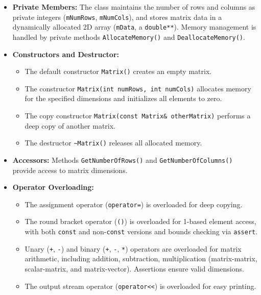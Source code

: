 \begin{itemize}
    \item \textbf{Private Members:} The class maintains the number of rows and columns as private integers (\texttt{mNumRows}, \texttt{mNumCols}), and stores matrix data in a dynamically allocated 2D array (\texttt{mData}, a \texttt{double**}). Memory management is handled by private methods \texttt{AllocateMemory()} and \texttt{DeallocateMemory()}.
    \item \textbf{Constructors and Destructor:}
        \begin{sloppypar}
        \begin{itemize}
            \item The default constructor \texttt{Matrix()} creates an empty matrix.
            \item The constructor \texttt{Matrix(int numRows, int numCols)} allocates memory for the specified dimensions and initializes all elements to zero.
            \item The copy constructor \texttt{Matrix(const Matrix\& otherMatrix)} performs a deep copy of another matrix.
            \item The destructor \texttt{\textasciitilde Matrix()} releases all allocated memory.
        \end{itemize}
        \end{sloppypar}
    \item \textbf{Accessors:} Methods \texttt{GetNumberOfRows()} and \texttt{GetNumberOfColumns()} provide access to matrix dimensions.
    \item \textbf{Operator Overloading:}
        \begin{itemize}
            \item The assignment operator (\texttt{operator=}) is overloaded for deep copying.
            \item The round bracket operator (\texttt{()}) is overloaded for 1-based element access, with both \texttt{const} and non-\texttt{const} versions and bounds checking via \texttt{assert}.
            \item Unary (\texttt{+}, \texttt{-}) and binary (\texttt{+}, \texttt{-}, \texttt{*}) operators are overloaded for matrix arithmetic, including addition, subtraction, multiplication (matrix-matrix, scalar-matrix, and matrix-vector). Assertions ensure valid dimensions.
            \item The output stream operator (\texttt{operator<<}) is overloaded for easy printing.
        \end{itemize}

\end{itemize}
